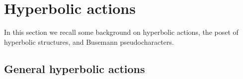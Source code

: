 






























































































\section{Hyperbolic actions}\label{sec:actions}

In this section we recall some background on hyperbolic actions, the poset of hyperbolic structures, and Busemann pseudocharacters.


\subsection{General hyperbolic actions}\label{ssec:general_hyp_actions}

